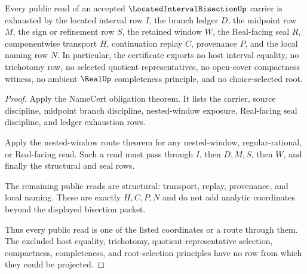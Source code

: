 \begin{theorem}
\label{thm:located-interval-bisection-nonescape}
Every public read of an accepted $\LocatedIntervalBisectionUp$ carrier is exhausted by the located interval row $I$, the branch ledger $D$, the midpoint row $M$, the sign or refinement row $S$, the retained window $W$, the Real-facing seal $R$, componentwise transport $H$, continuation replay $C$, provenance $P$, and the local naming row $N$. In particular, the certificate exports no host interval equality, no trichotomy row, no selected quotient representatives, no open-cover compactness witness, no ambient $\RealUp$ completeness principle, and no choice-selected root.
\end{theorem}
\begin{proof}
Apply the NameCert obligation theorem. It lists the carrier, source discipline, midpoint branch discipline, nested-window exposure, Real-facing seal discipline, and ledger exhaustion rows.

Apply the nested-window route theorem for any nested-window, regular-rational, or Real-facing read. Such a read must pass through $I$, then $D,M,S$, then $W$, and finally the structural and seal rows.

The remaining public reads are structural: transport, replay, provenance, and local naming. These are exactly $H,C,P,N$ and do not add analytic coordinates beyond the displayed bisection packet.

Thus every public read is one of the listed coordinates or a route through them. The excluded host equality, trichotomy, quotient-representative selection, compactness, completeness, and root-selection principles have no row from which they could be projected.
\end{proof}


